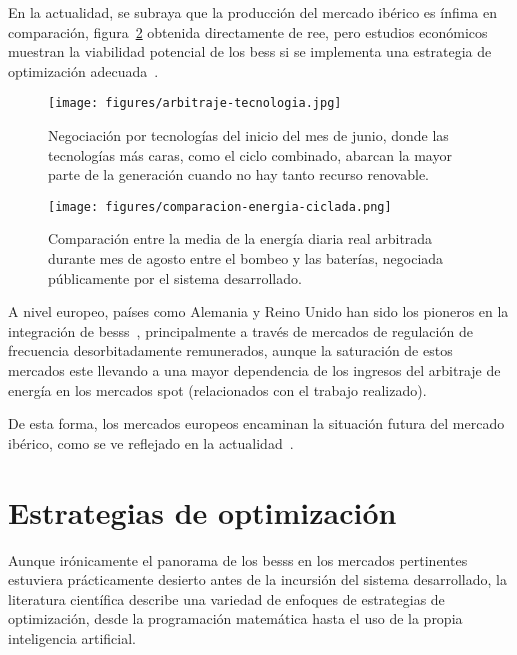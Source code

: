 En la actualidad, se subraya que la producción del mercado ibérico es ínfima en comparación, figura~\ref{fig:comparacion-energia-ciclada} obtenida directamente de \gls{ree}, pero estudios económicos muestran la viabilidad potencial de los \gls{bess} si se implementa una estrategia de optimización adecuada~\cite{he2015optimal}.

\begin{figure}
  \centering
  \texttt{[image: figures/arbitraje-tecnologia.jpg]}
  \caption[Negociación por tecnologías.]{Negociación por tecnologías del inicio del mes de junio, donde las tecnologías más caras, como el ciclo combinado, abarcan la mayor parte de la generación cuando no hay tanto recurso renovable.}
  \label{fig:arbitraje-tecnologia}
\end{figure}

\begin{figure}
  \centering
  \texttt{[image: figures/comparacion-energia-ciclada.png]}
  \caption[Comparación de la energía diaria arbitrada.]{Comparación entre la media de la energía diaria real arbitrada durante mes de agosto entre el bombeo y las baterías, negociada públicamente por el sistema desarrollado.}
  \label{fig:comparacion-energia-ciclada}
\end{figure}

A nivel europeo, países como Alemania y Reino Unido han sido los pioneros en la integración de \glspl{bess}~\cite{kivipelto2017grid, tejada2019review}, principalmente a través de mercados de regulación de frecuencia desorbitadamente remunerados, aunque la saturación de estos mercados este llevando a una mayor dependencia de los ingresos del arbitraje de energía en los mercados spot (relacionados con el trabajo realizado).

De esta forma, los mercados europeos encaminan la situación futura del mercado ibérico, como se ve reflejado en la actualidad~\cite{kumar2019strategic}.

\section{Estrategias de optimización}
\label{makereference2.2}

Aunque irónicamente el panorama de los \glspl{bess} en los mercados pertinentes estuviera prácticamente desierto antes de la incursión del sistema desarrollado, la literatura científica describe una variedad de enfoques de estrategias de optimización, desde la programación matemática hasta el uso de la propia inteligencia artificial.

